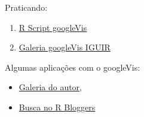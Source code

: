 \begin{frame}

 Praticando:
  \begin{enumerate}
  \item \href{run:./R/googleVis/googleVis.R}{R Script googleVis}
  \item \href{run:googleVis.html}{Galeria googleVis IGUIR}
  \end{enumerate}

  Algumas aplicações com o googleVis:
  \begin{itemize}
  \item
    \href{http://cran.r-project.org/web/packages/googleVis/vignettes/}{Galeria
      do autor},
  \item \href{http://www.r-bloggers.com/?s=googleVis}{Busca no R
      Bloggers}
  \end{itemize}

\end{frame}

